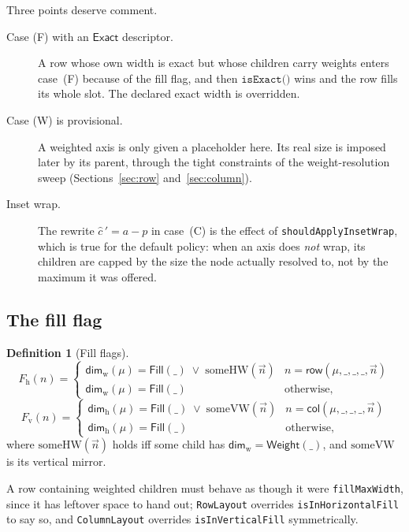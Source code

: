 \documentclass[11pt,a4paper]{article}
\newcommand{\Exact}{\mathsf{Exact}}
\newcommand{\Fill}{\mathsf{Fill}}
\newcommand{\Weight}{\mathsf{Weight}}
\newcommand{\rrow}{\mathsf{row}}
\newcommand{\ccol}{\mathsf{col}}
\newcommand{\Dimw}{\mathsf{dim}_{\mathrm{w}}}
\newcommand{\Dimh}{\mathsf{dim}_{\mathrm{h}}}
\newcommand{\jv}[1]{\texttt{#1}}       %
\theoremstyle{definition}
\newtheorem{definition}{Definition}[section]
\theoremstyle{plain}
\theoremstyle{remark}
\begin{document}
Three points deserve comment.

\begin{description}
  \item[Case (F) with an $\Exact$ descriptor.] A row whose own width is exact
    but whose children carry weights enters case~(F) because of the fill flag,
    and then $\jv{isExact()}$ wins and the row fills its whole slot. The
    declared exact width is overridden.
  \item[Case (W) is provisional.] A weighted axis is only given a placeholder
    here. Its real size is imposed later by its parent, through the tight
    constraints of the weight-resolution sweep (Sections~\ref{sec:row}
    and~\ref{sec:column}).
  \item[Inset wrap.] The rewrite $\hat c\,' = a - p$ in case~(C) is the effect of
    \jv{shouldApplyInsetWrap}, which is true for the default policy: when an
    axis does \emph{not} wrap, its children are capped by the size the node
    actually resolved to, not by the maximum it was offered.
\end{description}

\subsection{The fill flag}
\label{sec:fillflag}

\begin{definition}[Fill flags]
\[
  F_{\mathrm{h}}(n) =
  \begin{cases}
    \Dimw(\mu) = \Fill(\_) \;\vee\; \mathrm{someHW}(\vec{n})
      & n = \rrow(\mu, \_, \_, \_, \vec{n}) \\
    \Dimw(\mu) = \Fill(\_) & \text{otherwise,}
  \end{cases}
\]
\[
  F_{\mathrm{v}}(n) =
  \begin{cases}
    \Dimh(\mu) = \Fill(\_) \;\vee\; \mathrm{someVW}(\vec{n})
      & n = \ccol(\mu, \_, \_, \_, \vec{n}) \\
    \Dimh(\mu) = \Fill(\_) & \text{otherwise,}
  \end{cases}
\]
where $\mathrm{someHW}(\vec{n})$ holds iff some child has
$\Dimw = \Weight(\_)$, and $\mathrm{someVW}$ is its vertical mirror.
\end{definition}

A row containing weighted children must behave as though it were
\jv{fillMaxWidth}, since it has leftover space to hand out; \jv{RowLayout}
overrides \jv{isInHorizontalFill} to say so, and \jv{ColumnLayout} overrides
\jv{isInVerticalFill} symmetrically.
\end{document}
